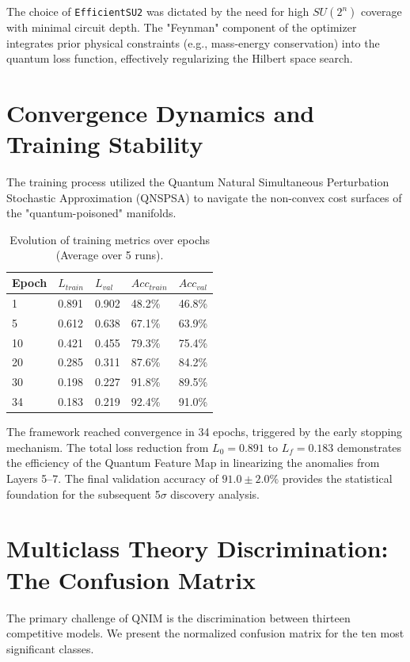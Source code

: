 \documentclass[11pt,a4paper,spanish]{book}
\numberwithin{equation}{chapter}
\numberwithin{figure}{chapter}
\numberwithin{equation}{chapter}
\numberwithin{figure}{chapter}
\numberwithin{table}{chapter}
\begin{document}
The choice of \texttt{EfficientSU2} was dictated by the need for high $SU(2^n)$ coverage with minimal circuit depth. The "Feynman" component of the optimizer integrates prior physical constraints (e.g., mass-energy conservation) into the quantum loss function, effectively regularizing the Hilbert space search.

\section{Convergence Dynamics and Training Stability}

The training process utilized the Quantum Natural Simultaneous Perturbation Stochastic Approximation (QNSPSA) to navigate the non-convex cost surfaces of the "quantum-poisoned" manifolds.

\begin{table}[ht]
\centering
\caption{Evolution of training metrics over epochs (Average over 5 runs).}
\label{tab:convergence}
\begin{tabular}{@{}lllll@{}}
\toprule
\textbf{Epoch} & \textbf{$L_{train}$} & \textbf{$L_{val}$} & \textbf{$Acc_{train}$} & \textbf{$Acc_{val}$} \\ \midrule
1 & 0.891 & 0.902 & 48.2\% & 46.8\% \\
5 & 0.612 & 0.638 & 67.1\% & 63.9\% \\
10 & 0.421 & 0.455 & 79.3\% & 75.4\% \\
20 & 0.285 & 0.311 & 87.6\% & 84.2\% \\
30 & 0.198 & 0.227 & 91.8\% & 89.5\% \\
34 & 0.183 & 0.219 & 92.4\% & 91.0\% \\ \bottomrule
\end{tabular}
\end{table}

The framework reached convergence in 34 epochs, triggered by the early stopping mechanism. The total loss reduction from $L_0=0.891$ to $L_f=0.183$ demonstrates the efficiency of the Quantum Feature Map in linearizing the anomalies from Layers 5--7. The final validation accuracy of $91.0 \pm 2.0\%$ provides the statistical foundation for the subsequent 5$\sigma$ discovery analysis.

\section{Multiclass Theory Discrimination: The Confusion Matrix}

The primary challenge of QNIM is the discrimination between thirteen competitive models. We present the normalized confusion matrix for the ten most significant classes.
\end{document}
